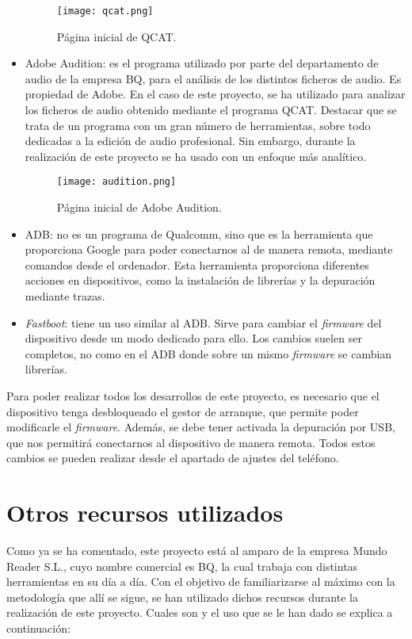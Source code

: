 \begin{itemize}
\begin{figure}[H]
		\centering
		\texttt{[image: qcat.png]}
		\caption{Página inicial de QCAT.}
		\label{fig:qcat}
	\end{figure}	
	\item{Adobe Audition: es el programa utilizado por parte del departamento de audio de la empresa BQ, para el análisis de los distintos ficheros de audio. Es propiedad de Adobe. En el caso de este proyecto, se ha utilizado para analizar los ficheros de audio obtenido mediante el programa \gls{QCAT}. Destacar que se trata de un programa con un gran número de herramientas, sobre todo dedicadas a la edición de audio profesional. Sin embargo, durante la realización de este proyecto se ha usado con un enfoque más analítico.}
	\begin{figure}[H]
		\centering
		\texttt{[image: audition.png]}
		\caption{Página inicial de Adobe Audition.}
		\label{fig:audition}
	\end{figure}	
	\item{\gls{ADB}: no es un programa de Qualcomm, sino que es la herramienta que proporciona Google para poder conectarnos al de manera remota, mediante comandos desde el ordenador. Esta herramienta proporciona diferentes acciones en dispositivos, como la instalación de librerías y la depuración mediante trazas.}
	\item{\textit{Fastboot}: tiene un uso similar al \gls{ADB}. Sirve para cambiar el \textit{firmware} del dispositivo desde un modo dedicado para ello. Los cambios suelen ser completos, no como en el \gls{ADB} donde sobre un mismo \textit{firmware} se cambian librerías.}
\end{itemize}

Para poder realizar todos los desarrollos de este proyecto, es necesario que el dispositivo tenga desbloqueado el gestor de arranque, que permite poder modificarle el \textit{firmware}. Además, se debe tener activada la depuración por \gls{USB}, que nos permitirá conectarnos al dispositivo de manera remota. Todos estos cambios se pueden realizar desde el apartado de ajustes del teléfono.

\section{Otros recursos utilizados} \label{sec:otros_recursos}
Como ya se ha comentado, este proyecto está al amparo de la empresa Mundo Reader S.L., cuyo nombre comercial es BQ, la cual trabaja con distintas herramientas en su día a día. Con el objetivo de familiarizarse al máximo con la metodología que allí se sigue, se han utilizado dichos recursos durante la realización de este proyecto. Cuales son y el uso que se le han dado se explica a continuación:

